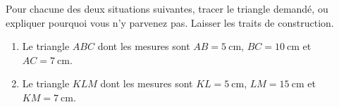 
\begin{exercice}\label{exosmath-0975}

    Pour chacune des deux situations suivantes, tracer le triangle demandé, ou expliquer pourquoi vous n'y parvenez pas. Laisser les traits de construction.
    \begin{enumerate}
        \item
            Le triangle \( ABC\) dont les mesures sont \( AB=\SI{5}{\centi\meter}\), \( BC=\SI{10}{\centi\meter}\) et \( AC=\SI{7}{\centi\meter}\).
        \item
            Le triangle \( KLM\) dont les mesures sont \( KL=\SI{5}{\centi\meter}\), \( LM=\SI{15}{\centi\meter}\) et \( KM=\SI{7}{\centi\meter}\).
    \end{enumerate}

\end{exercice}

